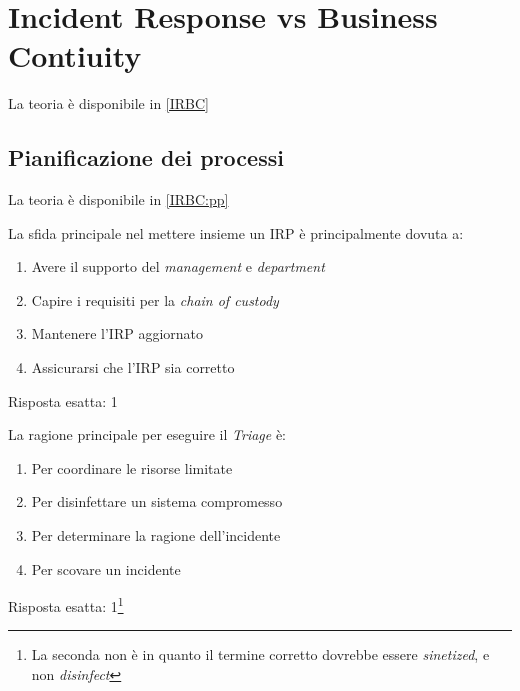 \section{Incident Response vs Business Contiuity}
\label{esIRBC}

La teoria \`e disponibile in \ref{IRBC}

\subsection{Pianificazione dei processi}
\label{esIRBC:pp}

La teoria \`e disponibile in \ref{IRBC:pp}



\begin{Exercise} [
  title={Quiz},
  label={esIRBC1}
  ]

  \Question La sfida principale nel mettere insieme un IRP \`e principalmente
dovuta a:
\begin{enumerate}
 \item Avere il supporto del \textit{management} e \textit{department}
 \item Capire i requisiti per la \textit{chain of custody}
 \item Mantenere l'IRP aggiornato
 \item Assicurarsi che l'IRP sia corretto
\end{enumerate}
\end{Exercise}

\begin{Answer} [
  ref={esIRBC1},
  number={1}
  ]

  \Question Risposta esatta: 1
\end{Answer}


\begin{Exercise} [
  title={Quiz},
  label={esIRBC2}
  ]

  \Question La ragione principale per eseguire il \textit{Triage} \`e:
  \begin{enumerate}
   \item Per coordinare le risorse limitate
   \item Per disinfettare un sistema compromesso
   \item Per determinare la ragione dell'incidente
   \item Per scovare un incidente
  \end{enumerate}

\end{Exercise}

\begin{Answer} [
  ref={esIRBC2},
  number={2}
  ]

  \Question Risposta esatta: 1\footnote{La seconda non \`e in quanto il termine
corretto dovrebbe essere \textit{sinetized}, e non \textit{disinfect}}
\end{Answer}


